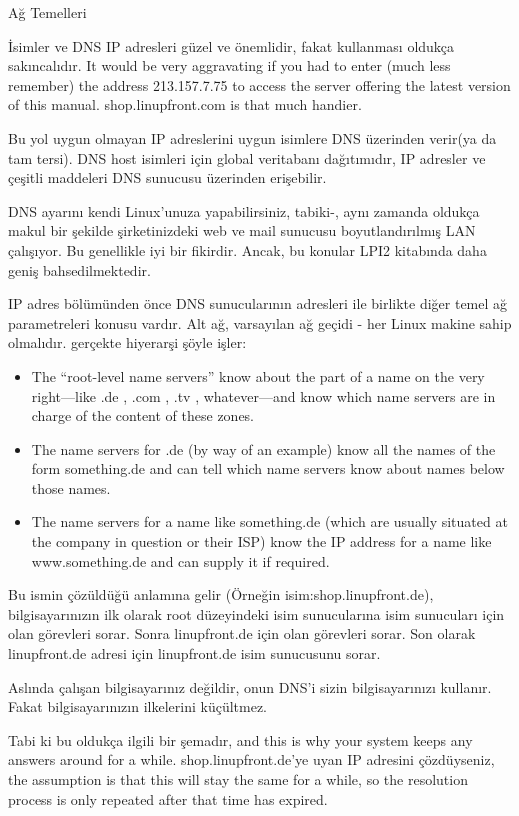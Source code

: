 \begin{section}{Ağ Temelleri}
\begin{subsection}{İsimler ve DNS}
IP adresleri güzel ve önemlidir, fakat kullanması oldukça sakıncalıdır. It would be very aggravating if you had to enter (much less remember) the address 213.157.7.75 to access the server offering the latest version of this manual. shop.linupfront.com is that much handier.

Bu yol uygun olmayan IP adreslerini uygun isimlere DNS üzerinden verir(ya da tam tersi). DNS host isimleri için global veritabanı dağıtımıdır, IP adresler ve çeşitli maddeleri DNS sunucusu üzerinden erişebilir.

DNS ayarını kendi Linux'unuza yapabilirsiniz, tabiki-, aynı zamanda oldukça makul bir şekilde şirketinizdeki web ve mail sunucusu boyutlandırılmış LAN çalışıyor. Bu genellikle iyi bir fikirdir. Ancak, bu konular LPI2 kitabında daha geniş bahsedilmektedir.

IP adres bölümünden önce DNS sunucularının adresleri ile birlikte diğer temel ağ parametreleri konusu vardır. Alt ağ, varsayılan ağ geçidi - her Linux makine sahip olmalıdır. gerçekte hiyerarşi şöyle işler:

\begin{itemize}
\item The “root-level name servers” know about the part of a name on the very right—like .de , .com , .tv , whatever—and know which name servers are in charge of the content of these zones.
\item The name servers for .de (by way of an example) know all the names of the form something.de and can tell which name servers know about names below those names.
\item The name servers for a name like something.de (which are usually situated at the company in question or their ISP) know the IP address for a name like www.something.de and can supply it if required.
\end{itemize}

Bu ismin çözüldüğü anlamına gelir (Örneğin isim:shop.linupfront.de), bilgisayarınızın ilk olarak root düzeyindeki isim sunucularına isim sunucuları için olan görevleri sorar. Sonra linupfront.de için olan görevleri sorar. Son olarak linupfront.de adresi için linupfront.de isim sunucusunu sorar.

Aslında çalışan bilgisayarınız değildir, onun DNS'i sizin bilgisayarınızı kullanır. Fakat bilgisayarınızın ilkelerini küçültmez.

Tabi ki bu oldukça ilgili bir şemadır, and this is why your system keeps any answers around for a while. shop.linupfront.de'ye uyan IP adresini çözdüyseniz, the assumption is that this will stay the same for a while, so the resolution process is only repeated after that time has expired.


\end{subsection}
\end{section}
